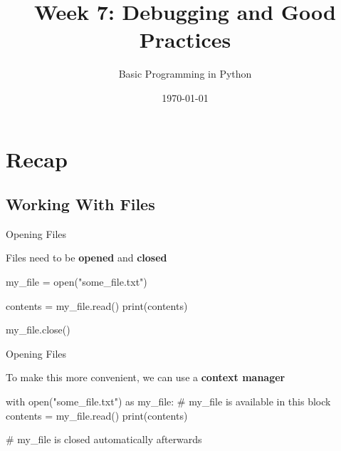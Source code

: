 



\title[Good Practices]{Week 7: Debugging and Good Practices}
\subtitle{Basic Programming in Python}


\date{\today}

\begin{frame}[plain]
     \titlepage
\end{frame}

\begin{frame}
    \tableofcontents
\end{frame}

\section{Recap}

\subsection{Working With Files}

\begin{frame}[fragile]{Opening Files}

    \begin{block}{}
        Files need to be \textbf{opened} and \textbf{closed}
    \end{block}

    \vspace{1em}

    \begin{pythoncode}
    my_file = open("some_file.txt")

    contents = my_file.read()
    print(contents)

    my_file.close()
    \end{pythoncode}

\end{frame}

\begin{frame}[fragile]{Opening Files}

    \begin{block}{}
        To make this more convenient, we can use a \textbf{context manager}
    \end{block}

    \vspace{1em}

    \begin{pythoncode}
    with open("some_file.txt") as my_file:
        # my_file is available in this block
        contents = my_file.read()
        print(contents)

    # my_file is closed automatically afterwards
    \end{pythoncode}


\end{frame}

